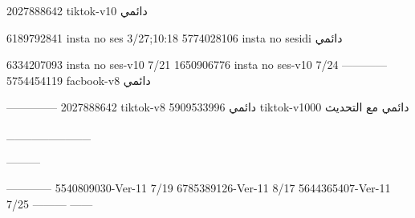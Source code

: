2027888642 tiktok-v10
دائمي

6189792841 insta no ses
3/27;10:18
5774028106 insta no sesidi
دائمي

6334207093 insta no ses-v10
7/21
1650906776 insta no ses-v10
7/24
------------
5754454119 facbook-v8
دائمي


--------------
2027888642 tiktok-v8
دائمي
5909533996 tiktok-v1000
دائمي مع التحديث

__________

---------

------------
5540809030-Ver-11
7/19
6785389126-Ver-11
8/17
5644365407-Ver-11
7/25
---------
------
